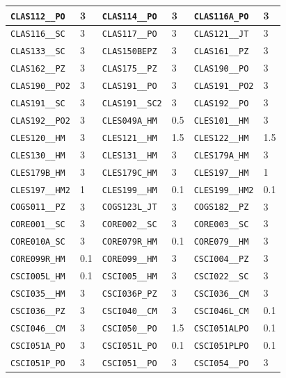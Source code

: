 \begin{longtable}{|l|l||l|l||l|l|}
    \verb|CLAS112__PO| & 3 & \verb|CLAS114__PO| & 3 & \verb|CLAS116A_PO| & 3\\\hline
    \verb|CLAS116__SC| & 3 & \verb|CLAS117__PO| & 3 & \verb|CLAS121__JT| & 3\\\hline
    \verb|CLAS133__SC| & 3 & \verb|CLAS150BEPZ| & 3 & \verb|CLAS161__PZ| & 3\\\hline
    \verb|CLAS162__PZ| & 3 & \verb|CLAS175__PZ| & 3 & \verb|CLAS190__PO| & 3\\\hline
    \verb|CLAS190__PO2| & 3 & \verb|CLAS191__PO| & 3 & \verb|CLAS191__PO2| & 3\\\hline
    \verb|CLAS191__SC| & 3 & \verb|CLAS191__SC2| & 3 & \verb|CLAS192__PO| & 3\\\hline
    \verb|CLAS192__PO2| & 3 & \verb|CLES049A_HM| & 0.5 & \verb|CLES101__HM| & 3\\\hline
    \verb|CLES120__HM| & 3 & \verb|CLES121__HM| & 1.5 & \verb|CLES122__HM| & 1.5\\\hline
    \verb|CLES130__HM| & 3 & \verb|CLES131__HM| & 3 & \verb|CLES179A_HM| & 3\\\hline
    \verb|CLES179B_HM| & 3 & \verb|CLES179C_HM| & 3 & \verb|CLES197__HM| & 1\\\hline
    \verb|CLES197__HM2| & 1 & \verb|CLES199__HM| & 0.1 & \verb|CLES199__HM2| & 0.1\\\hline
    \verb|COGS011__PZ| & 3 & \verb|COGS123L_JT| & 3 & \verb|COGS182__PZ| & 3\\\hline
    \verb|CORE001__SC| & 3 & \verb|CORE002__SC| & 3 & \verb|CORE003__SC| & 3\\\hline
    \verb|CORE010A_SC| & 3 & \verb|CORE079R_HM| & 0.1 & \verb|CORE079__HM| & 3\\\hline
    \verb|CORE099R_HM| & 0.1 & \verb|CORE099__HM| & 3 & \verb|CSCI004__PZ| & 3\\\hline
    \verb|CSCI005L_HM| & 0.1 & \verb|CSCI005__HM| & 3 & \verb|CSCI022__SC| & 3\\\hline
    \verb|CSCI035__HM| & 3 & \verb|CSCI036P_PZ| & 3 & \verb|CSCI036__CM| & 3\\\hline
    \verb|CSCI036__PZ| & 3 & \verb|CSCI040__CM| & 3 & \verb|CSCI046L_CM| & 0.1\\\hline
    \verb|CSCI046__CM| & 3 & \verb|CSCI050__PO| & 1.5 & \verb|CSCI051ALPO| & 0.1\\\hline
    \verb|CSCI051A_PO| & 3 & \verb|CSCI051L_PO| & 0.1 & \verb|CSCI051PLPO| & 0.1\\\hline
    \verb|CSCI051P_PO| & 3 & \verb|CSCI051__PO| & 3 & \verb|CSCI054__PO| & 3\\\hline

\end{longtable}
